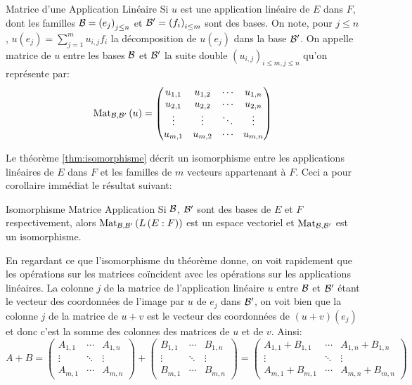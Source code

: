 \documentclass{classe}
\begin{document}
\begin{définition}{Matrice d'une Application Linéaire}{}
	Si $u$ est une application linéaire de $E$ dans $F$, dont les familles $\mathcal{B} = \left(e_{j}\right)_{j\leq n}$ et $\mathcal{B}' = \left(f_{i}\right)_{i\leq m}$ sont des bases.
	On note, pour $j \leq n$, $u\left( e_{j} \right) = \sum_{j = 1}^{m}u_{i, j}f_{i}$ la décomposition de $u(e_{j})$ dans la base $\mathcal{B}'$.
	On appelle matrice de $u$ entre les bases $\mathcal{B}$ et $\mathcal{B}'$ la suite double $\left( u_{i, j} \right)_{i \leq m, j\leq n}$ qu'on représente par:
	\begin{equation*}
		\operatorname{Mat}_{\mathcal{B}, \mathcal{B}'}\left( u \right) = \begin{pmatrix}
			u_{1, 1} & u_{1, 2} & \cdots & u_{1, n}\\
			u_{2, 1} & u_{2, 2} & \cdots & u_{2, n}\\
			\vdots & \vdots & \ddots & \vdots \\
			u_{m, 1} & u_{m, 2} & \cdots & u_{m, n}
		\end{pmatrix}
	\end{equation*}
\end{définition}

Le théorème \ref{thm:isomorphisme} décrit un isomorphisme entre les applications linéaires de $E$ dans $F$ et les familles de $m$ vecteurs appartenant à $F$.
Ceci a pour corollaire immédiat le résultat suivant:
\begin{théorème}{Isomorphisme Matrice Application}{}
	Si $\mathcal{B}$, $\mathcal{B}'$ sont des bases de $E$ et $F$ respectivement, alors $\operatorname{Mat}_{\mathcal{B}, \mathcal{B}'}\left( L\left( E:F \right) \right)$ est un espace vectoriel et $\operatorname{Mat}_{\mathcal{B}, \mathcal{B}'}$ est un isomorphisme.
\end{théorème}

En regardant ce que l'isomorphisme du théorème donne, on voit rapidement que les opérations sur les matrices coïncident avec les opérations sur les applications linéaires.
La colonne $j$ de la matrice de l'application linéaire $u$ entre $\mathcal{B}$ et $\mathcal{B}'$ étant le vecteur des coordonnées de l'image par $u$ de $e_{j}$ dans $\mathcal{B}'$, on voit bien que la colonne $j$ de la matrice de $u + v$ est le vecteur des coordonnées de $\left( u + v \right)(e_{j})$ et donc c'est la somme des colonnes des matrices de $u$ et de $v$.
Ainsi:
\begin{equation*}
	A + B = \begin{pmatrix}
		A_{1, 1} & \cdots & A_{1, n}\\
		\vdots & \ddots & \vdots\\
		A_{m, 1} & \cdots & A_{m, n}
	\end{pmatrix}
	 +
	 \begin{pmatrix}
		 B_{1, 1} & \cdots & B_{1, n}\\
		 \vdots & \ddots & \vdots\\
		 B_{m, 1} & \cdots & B_{m, n}
	 \end{pmatrix}
	 =
	 \begin{pmatrix}
		 A_{1, 1} + B_{1, 1} & \cdots & A_{1, n} + B_{1, n}\\
		 \vdots & \ddots & \vdots\\
		 A_{m, 1} + B_{m, 1} & \cdots & A_{m, n} + B_{m, n}
	 \end{pmatrix}
\end{equation*}
\end{document}
